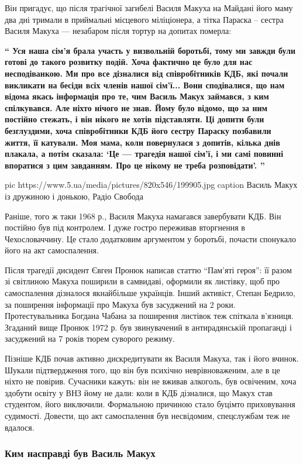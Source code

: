 Він пригадує, що після трагічної загибелі Василя Макуха на Майдані його
маму два дні тримали в приймальні місцевого міліціонера, а тітка Параска –
сестра Василя Макуха --- незабаром після тортур на допитах померла:

{\bfseries
\enquote{
Уся наша сім'я брала участь у визвольній боротьбі, тому ми завжди були
готові до такого розвитку подій. Хоча фактично це було для нас
несподіванкою. Ми про все дізналися від співробітників КДБ, які почали
викликати на бесіди всіх членів нашої сім'ї... Вони сподівалися, що нам
відома якась інформація про те, чим Василь Макух займався, з ким
спілкувався. Але ніхто нічого не знав. Йому було відомо, що за ним
постійно стежать, і він нікого не хотів підставляти. Ці допити були
безглуздими, хоча співробітники КДБ його сестру Параску позбавили життя,
її катували. Моя мама, коли повернулася з допитів, кілька днів плакала,
а потім сказала: \enquote{Це --- трагедія нашої сім'ї, і ми самі повинні впоратися
з цим завданням. Про це нікому не треба розповідати}.
}
}

\ifcmt
pic https://www.5.ua/media/pictures/820x546/199905.jpg
caption Василь Макух із дружиною і донькою, Радіо Свобода
\fi

Раніше, того ж таки 1968 р., Василя Макуха намагався завербувати КДБ. Він
постійно був під контролем. І дуже гостро переживав вторгнення в
Чехословаччину. Це стало додатковим аргументом у боротьбі, почасти
спонукало його на акт самоспалення.

Після трагедії дисидент Євген Пронюк написав статтю \enquote{Пам'яті героя}: її
разом зі світлиною Макуха поширили в самвидаві, оформили як листівку, щоб
про самоспалення дізналося якнайбільше українців. Інший активіст, Степан
Бедрило, за поширення інформації про Макуха був засуджений на 2 роки.
Протестувальника Богдана Чабана за поширення листівок теж спіткала
в'язниця. Згаданий вище Пронюк 1972 р. був звинувачений в антирадянській
пропаганді і засуджений на 7 років тюрем суворого режиму.

Пізніше КДБ почав активно дискредитувати як Василя Макуха, так і його
вчинок. Шукали підтвердження того, що він був психічно неврівноваженим,
але в це ніхто не повірив. Сучасники кажуть: він не вживав алкоголь, був
освіченим, хоча здобути освіту у ВНЗ йому не дали: коли в КДБ дізналися,
що Макух став студентом, його виключили. Формальною причиною стало буцімто
приховування судимості. Довести, що акт самоспалення був несвідомим,
спецслужбам теж не вдалося.

\subsubsection{Ким насправді був Василь Макух}

